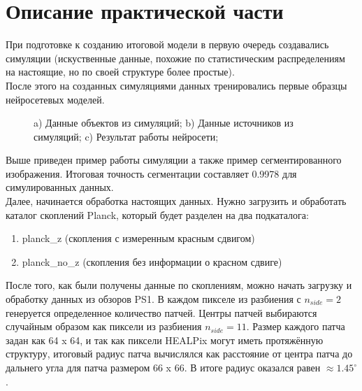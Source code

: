 \chapter{Описание практической части}
\label{cha:ch_4}

При подготовке к созданию итоговой модели в первую очередь создавались симуляции (искуственные 
данные, похожие по статистическим распределениям на настоящие, но по своей структуре более простые). \\

После этого на созданных симуляциями данных тренировались первые образцы нейросетевых моделей. 

\begin{figure}
	\begin{minipage}[h]{0.32\linewidth}
	\end{minipage}
	\begin{minipage}[h]{0.32\linewidth}
	\end{minipage}
	\begin{minipage}[h]{0.32\linewidth}
	\end{minipage}

	\caption{a) Данные объектов из симуляций; b) Данные источников из симуляций; 
		c) Результат работы нейросети;}
\end{figure}

Выше приведен пример работы симуляции а также пример сегментированного изображения. Итоговая точность 
сегментации составляет 0.9978 для симулированных данных.\\

Далее, начинается обработка настоящих данных. Нужно загрузить и обработать каталог скоплений Planck, 
который будет разделен на два подкаталога: 
\begin{enumerate}
	\item planck\_z (скопления с измеренным красным сдвигом)
	\item planck\_no\_z (скопления без информации о красном сдвиге)
\end{enumerate}

После того, как были получены данные по скоплениям, можно начать загрузку и обработку данных из 
обзоров PS1. В каждом пикселе из разбиения с $n_{side}=2$ генеруется определенное количество патчей. 
Центры патчей выбираются случайным образом как пиксели из разбиения $n_{side}=11$. Размер каждого 
патча задан как 64 x 64, и так как пиксели HEALPix могут иметь протяжённую структуру, итоговый 
радиус патча вычислялся как расстояние от центра патча до дальнего угла для патча размером 66 x 66. 
В итоге радиус оказался равен $\approx 1.45^{\circ}$. \\

